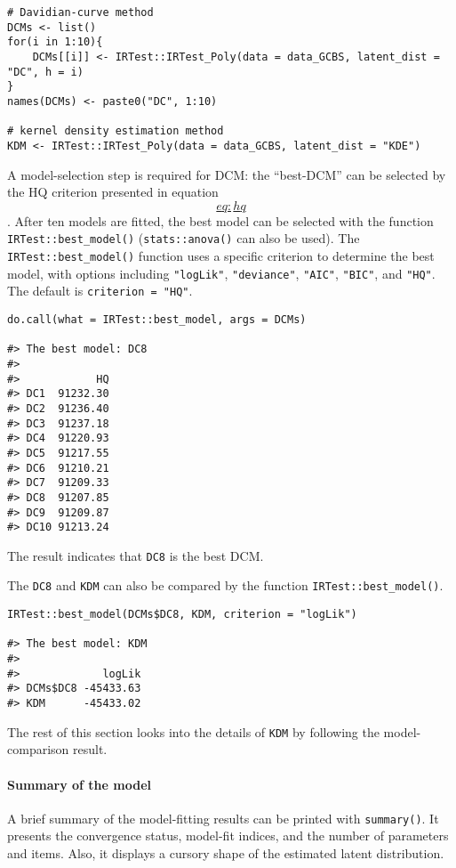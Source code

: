 \begin{verbatim}
# Davidian-curve method
DCMs <- list()
for(i in 1:10){
    DCMs[[i]] <- IRTest::IRTest_Poly(data = data_GCBS, latent_dist = "DC", h = i)
}
names(DCMs) <- paste0("DC", 1:10)

# kernel density estimation method
KDM <- IRTest::IRTest_Poly(data = data_GCBS, latent_dist = "KDE")
\end{verbatim}

A model-selection step is required for DCM: the ``best-DCM'' can be
selected by the HQ criterion \citep{Hannan+Quinn:1979} presented in equation
\protect\hyperlink{eq:hq}{\[eq:hq\]}. After ten
models are fitted, the best model can be selected with the function
\texttt{IRTest::best\_model()} (\texttt{stats::anova()} can also be used). The
\texttt{IRTest::best\_model()} function uses a specific criterion to determine
the best model, with options including \texttt{"logLik"}, \texttt{"deviance"},
\texttt{"AIC"}, \texttt{"BIC"}, and \texttt{"HQ"}. The default is \texttt{criterion~=~"HQ"}.

\begin{verbatim}
do.call(what = IRTest::best_model, args = DCMs)

#> The best model: DC8 
#> 
#>            HQ
#> DC1  91232.30
#> DC2  91236.40
#> DC3  91237.18
#> DC4  91220.93
#> DC5  91217.55
#> DC6  91210.21
#> DC7  91209.33
#> DC8  91207.85
#> DC9  91209.87
#> DC10 91213.24
\end{verbatim}

The result indicates that \texttt{DC8} is the best DCM.

The \texttt{DC8} and \texttt{KDM} can also be compared by the function
\texttt{IRTest::best\_model()}.

\begin{verbatim}
IRTest::best_model(DCMs$DC8, KDM, criterion = "logLik")

#> The best model: KDM 
#> 
#>             logLik
#> DCMs$DC8 -45433.63
#> KDM      -45433.02
\end{verbatim}

The rest of this section looks into the details of \texttt{KDM} by following
the model-comparison result.

\hypertarget{summary-of-the-model}{%
\paragraph{Summary of the model}\label{summary-of-the-model}}

A brief summary of the model-fitting results can be printed with
\texttt{summary()}. It presents the convergence status, model-fit indices, and
the number of parameters and items. Also, it displays a cursory shape of
the estimated latent distribution.

